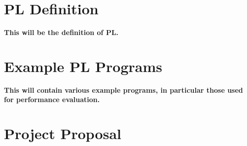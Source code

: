 \documentclass[12pt,a4paper,twoside,openright]{report}
\begin{document}
\appendix

\chapter{PL Definition}
 
\textbf{This will be the definition
	of PL.}
 
\chapter{Example PL Programs}

\textbf{This will contain various
	example programs, in particular
	those used for performance evaluation.}

\chapter{Project Proposal}


\end{document}
